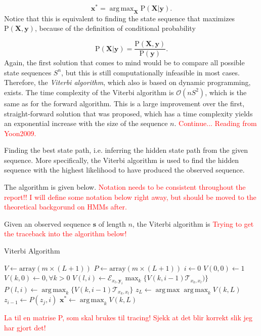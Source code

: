 \documentclass{article}
\DeclareMathOperator*{\argmax}{arg\,max}
\begin{document}
\begin{equation}
    \mathbf{x^*} = \argmax_\mathbf{X} \text{P}(\mathbf{X}|\mathbf{y}).
    \label{optimalStatePath}
\end{equation}
Notice that this is equivalent to finding the state sequence that maximizes $\text{P}(\mathbf{X}, \mathbf{y})$, because of the definition of conditional probability  

\begin{equation*}
    \text{P}(\mathbf{X}|\mathbf{y}) = \frac{\text{P}(\mathbf{X}, \mathbf{y})}{\text{P}(\mathbf{y})}.
\end{equation*}
Again, the first solution that comes to mind would be to compare all possible state sequences $S^n$, but this is still computationally infeasible in most cases. Therefore, the \textit{Viterbi algorithm}, which also is based on dynamic programming, exists. The time complexity of the Viterbi algorithm is $\mathcal{O}(nS^2)$, which is the same as for the forward algorithm. This is a large improvement over the first, straight-forward solution that was proposed, which has a time complexity yields an exponential increase with the size of the sequence $n$. \textcolor{red}{Continue... Reading from Yoon2009.}

Finding the best state path, i.e. inferring the hidden state path from the given sequence. More specifically, the Viterbi algorithm is used to find the hidden sequence with the highest likelihood to have produced the observed sequence. 

The algorithm is given below. \textcolor{red}{Notation needs to be consistent throughout the report!! I will define some notation below right away, but should be moved to the theoretical backgorund on HMMs after.}

Given an observed sequence $\mathbf{s}$ of length $n$, the Viterbi algorithm is \textcolor{red}{Trying to get the traceback into the algorithm below!}

\begin{algorithm}
\caption{Viterbi Algorithm}\label{alg:Viterbi}
\begin{algorithmic}
    \STATE $V \gets \text{array}(m \times (L+1))$
    \STATE $P \gets \text{array}(m \times (L+1))$
    \STATE $i \gets 0$
    \STATE $V(0,0) \gets 1$
    \STATE $V(k,0) \gets 0, \forall k > 0$
        \STATE $V(l,i) \gets \mathcal{E}_{x_l, \mathbf{y}_i}\max_k\{V(k, i-1)\mathcal{T}_{x_k,x_l})\}$
        \STATE $P(l,i) \gets \argmax_k\{V(k, i-1)\mathcal{T}_{x_k,x_l}\}$
    \ENDFOR
    \STATE $z_L \gets \argmax \argmax_kV(k, L)$
        \STATE $z_{i-1} \gets P(z_j, i)$ 
    \ENDFOR 
    \RETURN $\mathbf{x}^* \gets \argmax_kV(k, L)$

\end{algorithmic} 
\end{algorithm} 
\textcolor{red}{La til en matrise P, som skal brukes til tracing! Sjekk at det blir korrekt slik jeg har gjort det!}
\end{document}
